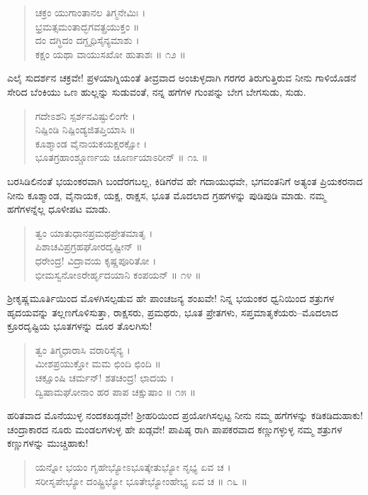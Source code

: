 \begin{verse}
ಚಕ್ರಂ ಯುಗಾಂತಾನಲ ತಿಗ್ಮನೇಮಿಃ ।\\ಭ್ರಮತ್ಸಮಂತಾದ್ಭಗವತ್ಪ್ರಯುಕ್ತಂ ॥\\ದಂ ದಗ್ಧಿದಂ ದಗ್ದೃಧಿಸೈನ್ಯಮಾಶು ।\\ಕಕ್ಷಂ ಯಥಾ ವಾಯುಸಖೋ ಹುತಾಶಃ \num{ ॥ ೧೨ ॥}
\end{verse}

ಎಲೈ ಸುದರ್ಶನ ಚಕ್ರವೇ! ಪ್ರಳಯಾಗ್ನಿಯಂತೆ ತೀವ್ರವಾದ ಅಂಚುಳ್ಳದಾಗಿ ಗರಗರ ತಿರುಗುತ್ತಿರುವ ನೀನು ಗಾಳಿಯೊಡನೆ ಸೇರಿದ ಬೆಂಕಿಯು ಒಣ ಹುಲ್ಲನ್ನು ಸುಡುವಂತೆ, ನನ್ನ ಹಗೆಗಳ ಗುಂಪನ್ನು ಬೇಗ ಬೇಗಸುಡು, ಸುಡು.

\begin{verse}
ಗದೇಽಶನಿ ಸ್ಪರ್ಶನವಿಷ್ಫುಲಿಂಗೇ ।\\ನಿಷ್ಪಿಂಡಿ ನಿಷ್ಪಿಂಡ್ಯಜಿತಪ್ತಿಯಾಸಿ ॥\\ಕೂಶ್ಮಾಂಡ ವೈನಾಯಕಯಕ್ಷರಕ್ಷೋ ।\\ಭೂತಗ್ರಹಾಂಶ್ಚೂರ್ಣಯ ಚೂರ್ಣಯಾಽರೀನ್ \num{॥ ೧೩ ॥}
\end{verse}

ಬರಸಿಡಿಲಿನಂತೆ ಭಯಂಕರವಾಗಿ ಬಂದೆರಗಬಲ್ಲ, ಕಿಡಿಗರೆವ ಹೇ ಗದಾಯುಧವೇ, ಭಗವಂತನಿಗೆ ಅತ್ಯಂತ ಪ್ರಿಯಕರನಾದ ನೀನು ಕೂಶ್ಮಾಂಡ, ವೈನಾಯಕ, ಯಕ್ಷ, ರಾಕ್ಷಸ, ಭೂತ ಮೊದಲಾದ ಗ್ರಹಗಳನ್ನು ಪುಡಿಪುಡಿ ಮಾಡು. ನಮ್ಮ ಹಗೆಗಳನ್ನೆಲ್ಲ ಧೂಳೀಪಟ ಮಾಡು.

\begin{verse}
ತ್ವಂ ಯಾತುಧಾನಪ್ರಮಥಪ್ರೇತಮಾತೃ ।\\ಪಿಶಾಚವಿಪ್ರಗ್ರಹಘೋರದೃಷ್ಟೀನ್ ॥\\ಧರೇಂದ್ರ! ವಿದ್ರಾವಯ ಕೃಷ್ಣಪೂರಿತೋ ।\\ಭೀಮಸ್ವನೋಽರೇರ್ಹೃದಯಾನಿ ಕಂಪಯನ್ \num{॥ ೧೪ ॥}
\end{verse}

ಶ್ರೀಕೃಷ್ಣಮೂರ್ತಿಯಿಂದ ಮೊಳಗಿಸಲ್ಪಡುವ ಹೇ ಪಾಂಚಜನ್ಯ ಶಂಖವೇ! ನಿನ್ನ ಭಯಂಕರ ಧ್ವನಿಯಿಂದ ಶತ್ರುಗಳ ಹೃದಯವನ್ನು ತಲ್ಲಣಗೊಳಿಸುತ್ತಾ, ರಾಕ್ಷಸರು, ಪ್ರಮಥರು, ಭೂತ ಪ್ರೇತಗಳು, ಸಪ್ತಮಾತೃಕೆಯರು–ಮೊದಲಾದ ಕ್ರೂರದೃಷ್ಟಿಯ ಭೂತಗಳನ್ನು ದೂರ ತೊಲಗಿಸು!

\begin{verse}
ತ್ವಂ ತಿಗ್ಮಧಾರಾಸಿ ವರಾರಿಸೈನ್ಯ ।\\ಮೀಶಪ್ರಯುಕ್ತೋ ಮಮ ಛಿಂದಿ ಛಿಂದಿ ॥\\ಚಕ್ಷೂಂಷಿ ಚರ್ಮನ್! ಶತಚಂದ್ರ! ಛಾದಯ ।\\ದ್ವಿಷಾಮಘೋನಾಂ ಹರ ಪಾಪ ಚಕ್ಷುಷಾಂ \num{॥ ೧೫ ॥}
\end{verse}

ಹರಿತವಾದ ಮೊನೆಯುಳ್ಳ ನಂದಕಖಡ್ಗವೇ! ಶ್ರೀಹರಿಯಿಂದ ಪ್ರಯೋಗಿಸಲ್ಪಟ್ಟ ನೀನು ನಮ್ಮ ಹಗೆಗಳನ್ನು ಕಡಿಕಡಿದುಹಾಕು! ಚಂದ್ರಾಕಾರದ ನೂರು ಮಂಡಲಗಳುಳ್ಳ ಹೇ ಖಡ್ಗವೇ! ಪಾಪಿಷ್ಠ ರಾಗಿ ಪಾಪಕರವಾದ ಕಣ್ಣುಗಳ್ಳುಳ್ಳ ನಮ್ಮ ಶತ್ರುಗಳ ಕಣ್ಣುಗಳನ್ನು ಮುಚ್ಚಿಹಾಕು!

\begin{verse}
ಯನ್ನೋ ಭಯಂ ಗೃಹೇಭ್ಯೋಽಭೂತ್ಕೇತುಭ್ಯೋ ನೃಭ್ಯ ಏವ ಚ ।\\ಸರೀಸೃಪೇಭ್ಯೋ ದಂಷ್ಟ್ರಿಭ್ಯೋ ಭೂತೇಭ್ಯೋಂಹೇಭ್ಯ ಏವ ಚ \num{॥ ೧೬ ॥}
\end{verse}

